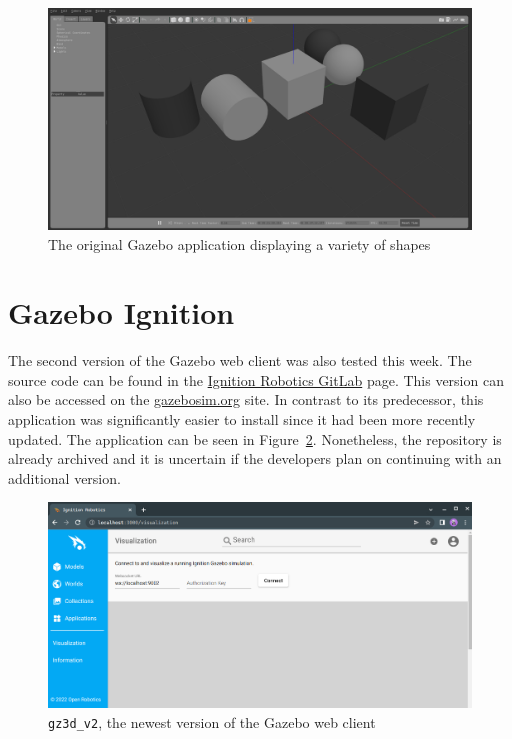     \begin{figure}[H]
        \centering
        \includegraphics[width=\linewidth]{Images/08_gazAppBoxes.png}
        \caption{The original Gazebo application displaying a variety of shapes}
        \label{fig:gazBoxes}
    \end{figure}
    
\section{Gazebo Ignition}

    The second version of the Gazebo web client was also tested this week. The source code can be found in the \href{https://gitlab.com/ignitionrobotics/web/app/-/tree/gz3d_v2/}{Ignition Robotics GitLab} page. This version can also be accessed on the \href{https://app.gazebosim.org/dashboard}{gazebosim.org} site. In contrast to its predecessor, this application was significantly easier to install since it had been more recently updated. The application can be seen in Figure~\ref{fig:Ignition}. Nonetheless, the repository is already archived and it is uncertain if the developers plan on continuing with an additional version.

    \begin{figure}[H]
        \centering
        \includegraphics[width=\linewidth]{Images/08_ignition.png}
        \caption{\texttt{gz3d\_v2}, the newest version of the Gazebo web client}
        \label{fig:Ignition}
    \end{figure}



